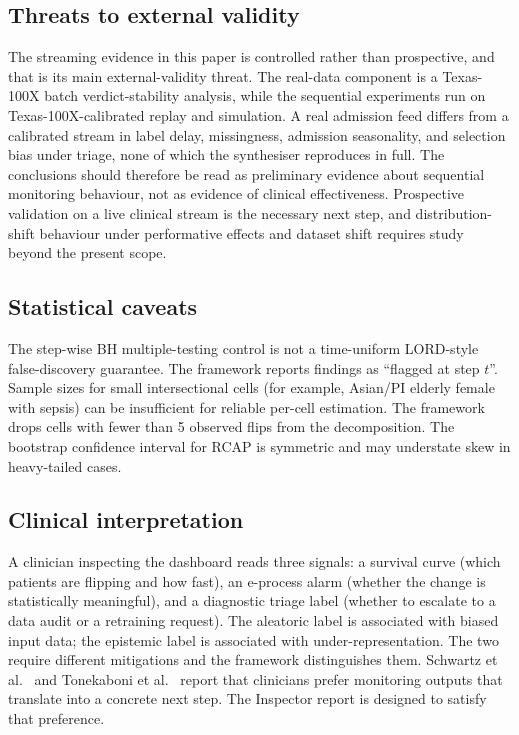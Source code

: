 \documentclass[acmsmall,nonacm,review,anonymous]{acmart}
\newcommand{\1}[1]{\mathbf{1}\!\left\{#1\right\}}
\begin{document}
\subsection{Threats to external validity}

The streaming evidence in this paper is controlled rather than prospective, and that is its main external-validity threat. The real-data component is a Texas-100X batch verdict-stability analysis, while the sequential experiments run on Texas-100X-calibrated replay and simulation. A real admission feed differs from a calibrated stream in label delay, missingness, admission seasonality, and selection bias under triage, none of which the synthesiser reproduces in full. The conclusions should therefore be read as preliminary evidence about sequential monitoring behaviour, not as evidence of clinical effectiveness. Prospective validation on a live clinical stream is the necessary next step, and distribution-shift behaviour under performative effects \cite{perdomo2020} and dataset shift \cite{finlayson2021, koh2021wilds} requires study beyond the present scope.

\subsection{Statistical caveats}

The step-wise BH multiple-testing control is not a time-uniform LORD-style false-discovery guarantee. The framework reports findings as ``flagged at step $t$''. Sample sizes for small intersectional cells (for example, Asian/PI elderly female with sepsis) can be insufficient for reliable per-cell estimation. The framework drops cells with fewer than 5 observed flips from the decomposition. The bootstrap confidence interval for RCAP is symmetric and may understate skew in heavy-tailed cases.

\subsection{Clinical interpretation}

A clinician inspecting the dashboard reads three signals: a survival curve (which patients are flipping and how fast), an e-process alarm (whether the change is statistically meaningful), and a diagnostic triage label (whether to escalate to a data audit or a retraining request). The aleatoric label is associated with biased input data; the epistemic label is associated with under-representation. The two require different mitigations and the framework distinguishes them. Schwartz et al.\ \cite{schwartz2023} and Tonekaboni et al.\ \cite{tonekaboni2019} report that clinicians prefer monitoring outputs that translate into a concrete next step. The Inspector report is designed to satisfy that preference.
\end{document}
